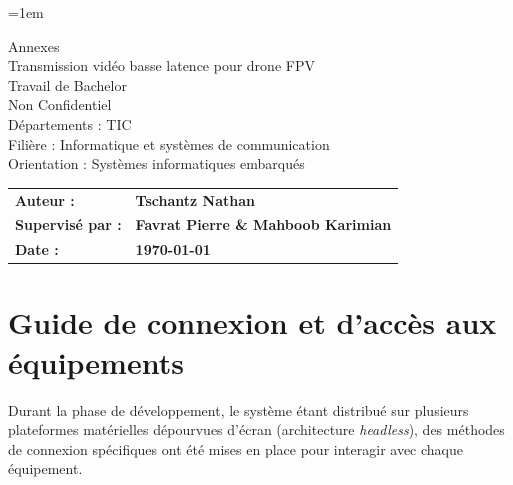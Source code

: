 \documentclass[a4paper,12pt]{article}
\begin{document}
\emergencystretch=1em 

\thispagestyle{firstpage}
\vspace*{2cm}
\begin{center}
    \Huge Annexes\\
    \vspace{0.6cm}
    \Huge Transmission vidéo basse latence pour drone FPV\\
    \vspace{0.2cm}
    \Large Travail de Bachelor\\
    \vspace{0.2cm}
    \small Non Confidentiel\\
    \vspace{0.5cm}
    Départements : TIC\\
    \vspace{0.5cm}
    Filière : Informatique et systèmes de communication\\
    \vspace{0.5cm}
    Orientation : Systèmes informatiques embarqués\\
\end{center}

\vspace{9cm}

\renewcommand{\arraystretch}{1.5} 

\begin{flushleft} 
    \begin{tabular}{@{}l l@{}}
        \textbf{Auteur :}      & \textbf{Tschantz Nathan} \\
        \textbf{Supervisé par :}   & \textbf{Favrat Pierre \& Mahboob Karimian} \\
        \textbf{Date :}         & \textbf{\today} \\
    \end{tabular}
\end{flushleft}

\pagestyle{otherpages}

\newpage
\thispagestyle{empty}
\mbox{}
\newpage

\tableofcontents 
\newpage
\listoftables     

\newpage

\section{Guide de connexion et d'accès aux équipements}
\label{annexe:connexion}

Durant la phase de développement, le système étant distribué sur plusieurs plateformes matérielles dépourvues d'écran (architecture \textit{headless}), des méthodes de connexion spécifiques ont été mises en place pour interagir avec chaque équipement.
\end{document}
